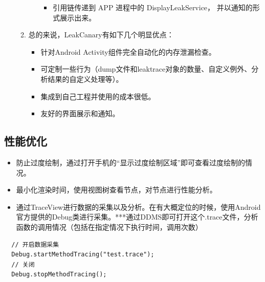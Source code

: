 \documentclass[9pt, b5paper]{article}
\begin{document}
\begin{enumerate}
\begin{enumerate}
\begin{itemize}
\begin{itemize}
\item 引用链传递到 APP 进程中的 DisplayLeakService， 并以通知的形式展示出来。
\end{itemize}
\end{itemize}
\item 总的来说，LeakCanary有如下几个明显优点：
\label{sec-1-1-7-2-2}
\begin{itemize}
\item 针对Android Activity组件完全自动化的内存泄漏检查。
\item 可定制一些行为（dump文件和leaktrace对象的数量、自定义例外、分析结果的自定义处理等）。
\item 集成到自己工程并使用的成本很低。
\item 友好的界面展示和通知。
\end{itemize}
\end{enumerate}
\end{enumerate}

\subsection{性能优化}
\label{sec-1-2}
\begin{itemize}
\item 防止过度绘制，通过打开手机的“显示过度绘制区域”即可查看过度绘制的情况。
\item 最小化渲染时间，使用视图树查看节点，对节点进行性能分析。
\item 通过TraceView进行数据的采集以及分析。在有大概定位的时候，使用Android官方提供的Debug类进行采集。***通过DDMS即可打开这个.trace文件，分析函数的调用情况（包括在指定情况下执行时间，调用次数）
\end{itemize}
\begin{verbatim}
  // 开启数据采集 
  Debug.startMethodTracing("test.trace"); 
  // 关闭 
  Debug.stopMethodTracing();
\end{verbatim}
\end{document}
